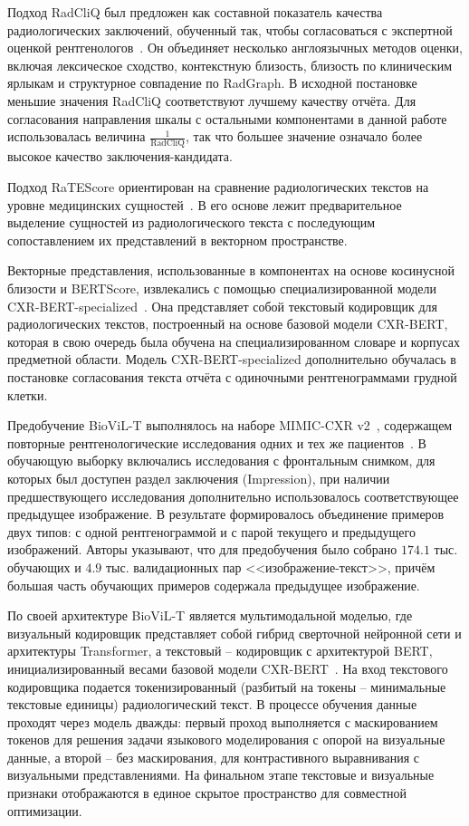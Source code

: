 Подход RadCliQ был предложен как составной показатель качества радиологических заключений, обученный так, чтобы согласоваться с экспертной оценкой рентгенологов~\cite{yu2023evaluating}. Он объединяет несколько англоязычных методов оценки, включая лексическое сходство, контекстную близость, близость по клиническим ярлыкам и структурное совпадение по RadGraph. В исходной постановке меньшие значения RadCliQ соответствуют лучшему качеству отчёта. Для согласования направления шкалы с остальными компонентами в данной работе использовалась величина
$\frac{1}{\mathrm{RadCliQ}}$, так что большее значение означало более высокое качество заключения-кандидата.

Подход RaTEScore ориентирован на сравнение радиологических текстов на уровне медицинских сущностей~\cite{zhao2024ratescore}. В его основе лежит предварительное выделение сущностей из радиологического текста с последующим сопоставлением их представлений в векторном пространстве.

Векторные представления, использованные в компонентах на основе косинусной близости и BERTScore, извлекались с помощью специализированной модели CXR-BERT-specialized~\cite{boecking2022making}. Она представляет собой текстовый кодировщик для радиологических текстов, построенный на основе базовой модели CXR-BERT, которая в свою очередь была обучена на специализированном словаре и корпусах предметной области. Модель CXR-BERT-specialized дополнительно обучалась в постановке согласования текста отчёта с одиночными рентгенограммами грудной клетки. 

Предобучение BioViL-T выполнялось на наборе MIMIC-CXR v2~\cite{mimic_cxr_dataset,mimic_cxr_scidata}, содержащем повторные рентгенологические исследования одних и тех же пациентов~\cite{bannur2023learning}. В обучающую выборку включались исследования с фронтальным снимком, для которых был доступен раздел заключения (Impression), при наличии предшествующего исследования дополнительно использовалось соответствующее предыдущее изображение. В результате формировалось объединение примеров двух типов: с одной рентгенограммой и с парой текущего и предыдущего изображений. Авторы указывают, что для предобучения было собрано $174.1$ тыс. обучающих и $4.9$ тыс. валидационных пар <<изображение-текст>>, причём большая часть обучающих примеров содержала предыдущее изображение.

По своей архитектуре BioViL-T является мультимодальной моделью, где визуальный кодировщик представляет собой гибрид сверточной нейронной сети и архитектуры Transformer, а текстовый -- кодировщик с архитектурой BERT, инициализированный весами базовой модели CXR-BERT~\cite{bannur2023learning}. На вход текстового кодировщика подается токенизированный (разбитый на токены -- минимальные текстовые единицы) радиологический текст. В процессе обучения данные проходят через модель дважды: первый проход выполняется с маскированием токенов для решения задачи языкового моделирования с опорой на визуальные данные, а второй -- без маскирования, для контрастивного выравнивания с визуальными представлениями. На финальном этапе текстовые и визуальные признаки отображаются в единое скрытое пространство для совместной оптимизации.

